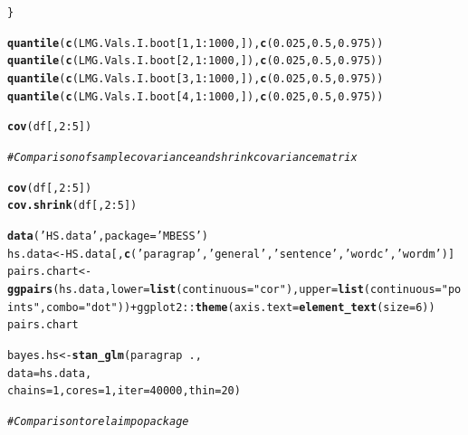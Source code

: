 \documentclass[11pt,a4paper,twoside]{book}\usepackage[]{graphicx}\usepackage[]{color}
\makeatletter
\newcommand{\hlnum}[1]{\textcolor[rgb]{0.686,0.059,0.569}{#1}}%
\newcommand{\hlstr}[1]{\textcolor[rgb]{0.192,0.494,0.8}{#1}}%
\newcommand{\hlcom}[1]{\textcolor[rgb]{0.678,0.584,0.686}{\textit{#1}}}%
\newcommand{\hlopt}[1]{\textcolor[rgb]{0,0,0}{#1}}%
\newcommand{\hlstd}[1]{\textcolor[rgb]{0.345,0.345,0.345}{#1}}%
\newcommand{\hlkwb}[1]{\textcolor[rgb]{0.69,0.353,0.396}{#1}}%
\newcommand{\hlkwc}[1]{\textcolor[rgb]{0.333,0.667,0.333}{#1}}%
\newcommand{\hlkwd}[1]{\textcolor[rgb]{0.737,0.353,0.396}{\textbf{#1}}}%
\newenvironment{kframe}{%
 \def\at@end@of@kframe{}%
 \ifinner\ifhmode%
  \def\at@end@of@kframe{\end{minipage}}%
  \begin{minipage}{\columnwidth}%
 \fi\fi%
 \def\FrameCommand##1{\hskip\@totalleftmargin \hskip-\fboxsep
 \colorbox{shadecolor}{##1}\hskip-\fboxsep
     \hskip-\linewidth \hskip-\@totalleftmargin \hskip\columnwidth}%
 \MakeFramed {\advance\hsize-\width
   \@totalleftmargin\z@ \linewidth\hsize
   \@setminipage}}%
 {\par\unskip\endMakeFramed%
 \at@end@of@kframe}
\newenvironment{knitrout}{}{} %
\makeatother
\begin{document}
\begin{knitrout}
\begin{kframe}
\begin{alltt}
\hlstd{\}}

\hlkwd{quantile}\hlstd{(}\hlkwd{c}\hlstd{(LMG.Vals.I.boot[}\hlnum{1}\hlstd{,}\hlnum{1}\hlopt{:}\hlnum{1000}\hlstd{,]),} \hlkwd{c}\hlstd{(}\hlnum{0.025}\hlstd{,} \hlnum{0.5}\hlstd{,} \hlnum{0.975}\hlstd{))}
\hlkwd{quantile}\hlstd{(}\hlkwd{c}\hlstd{(LMG.Vals.I.boot[}\hlnum{2}\hlstd{,}\hlnum{1}\hlopt{:}\hlnum{1000}\hlstd{,]),} \hlkwd{c}\hlstd{(}\hlnum{0.025}\hlstd{,} \hlnum{0.5}\hlstd{,} \hlnum{0.975}\hlstd{))}
\hlkwd{quantile}\hlstd{(}\hlkwd{c}\hlstd{(LMG.Vals.I.boot[}\hlnum{3}\hlstd{,}\hlnum{1}\hlopt{:}\hlnum{1000}\hlstd{,]),} \hlkwd{c}\hlstd{(}\hlnum{0.025}\hlstd{,} \hlnum{0.5}\hlstd{,} \hlnum{0.975}\hlstd{))}
\hlkwd{quantile}\hlstd{(}\hlkwd{c}\hlstd{(LMG.Vals.I.boot[}\hlnum{4}\hlstd{,}\hlnum{1}\hlopt{:}\hlnum{1000}\hlstd{,]),} \hlkwd{c}\hlstd{(}\hlnum{0.025}\hlstd{,} \hlnum{0.5}\hlstd{,} \hlnum{0.975}\hlstd{))}



\hlkwd{cov}\hlstd{(df[,}\hlnum{2}\hlopt{:}\hlnum{5}\hlstd{])}

\hlcom{#Comparison of sample covariance and shrink covariance matrix}

\hlkwd{cov}\hlstd{(df[,}\hlnum{2}\hlopt{:}\hlnum{5}\hlstd{])}
\hlkwd{cov.shrink}\hlstd{(df[,}\hlnum{2}\hlopt{:}\hlnum{5}\hlstd{])}

\hlkwd{data}\hlstd{(}\hlstr{'HS.data'}\hlstd{,} \hlkwc{package}\hlstd{=}\hlstr{'MBESS'}\hlstd{)}
\hlstd{hs.data} \hlkwb{<-} \hlstd{HS.data[,}\hlkwd{c}\hlstd{(}\hlstr{'paragrap'}\hlstd{,}\hlstr{'general'}\hlstd{,} \hlstr{'sentence'} \hlstd{,} \hlstr{'wordc'} \hlstd{,} \hlstr{'wordm'}\hlstd{)]}
\hlstd{pairs.chart} \hlkwb{<-} \hlkwd{ggpairs}\hlstd{(hs.data,} \hlkwc{lower} \hlstd{=} \hlkwd{list}\hlstd{(}\hlkwc{continuous} \hlstd{=} \hlstr{"cor"}\hlstd{),} \hlkwc{upper} \hlstd{=} \hlkwd{list}\hlstd{(}\hlkwc{continuous} \hlstd{=} \hlstr{"points"}\hlstd{,} \hlkwc{combo} \hlstd{=} \hlstr{"dot"}\hlstd{))} \hlopt{+} \hlstd{ggplot2}\hlopt{::}\hlkwd{theme}\hlstd{(}\hlkwc{axis.text} \hlstd{=} \hlkwd{element_text}\hlstd{(}\hlkwc{size} \hlstd{=} \hlnum{6}\hlstd{))}
\hlstd{pairs.chart}



\hlstd{bayes.hs} \hlkwb{<-} \hlkwd{stan_glm}\hlstd{(paragrap} \hlopt{~} \hlstd{. ,}
                  \hlkwc{data} \hlstd{= hs.data,}
                  \hlkwc{chains} \hlstd{=} \hlnum{1}\hlstd{,} \hlkwc{cores} \hlstd{=} \hlnum{1}\hlstd{,} \hlkwc{iter}\hlstd{=}\hlnum{40000}\hlstd{,} \hlkwc{thin}\hlstd{=}\hlnum{20}\hlstd{)}

\hlcom{# Comparison to relaimpo package}




\end{alltt}
\end{kframe}
\end{knitrout}
\end{document}
